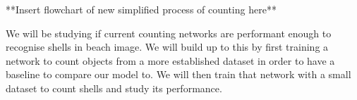 **Insert flowchart of new simplified process of counting here**

We will be studying if current counting networks are performant enough to recognise shells in beach image. We will build up to this by first training a network to count objects from a more established dataset in order to have a baseline to compare our model to. We will then train that network with a small dataset to count shells and study its performance. 